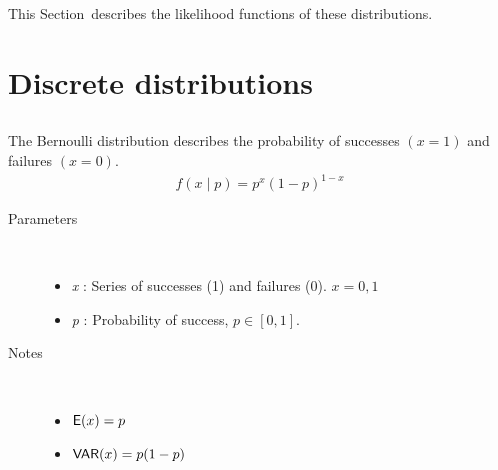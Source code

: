 \documentclass[]{jss}
\begin{document}
This Section~describes the likelihood functions of these distributions.

\section{Discrete distributions}
\label{chap:discrete-distributions} 

\subsection[bernoulli]{}
     
The Bernoulli distribution describes the probability of successes $(x=1)$ and
failures $(x=0)$.
\begin{eqnarray*}
    f(x \mid p) = p^{x} (1-p)^{1-x}
\end{eqnarray*}

\begin{description}
\item[Parameters] \ 

\begin{itemize}
\item {} 
\emph{x} : Series of successes (1) and failures (0). $x=0,1$

\item {} 
\emph{p} : Probability of success, $p \in [0,1]$.
\end{itemize}
\item[Notes] \ 
\begin{itemize}
\item {} 
$\mathsf{E}(x)= p$
\item {} 
$\mathsf{VAR}(x)= p(1-p)$
\end{itemize}
\end{description}


\subsection[binomial]{}
\end{document}
